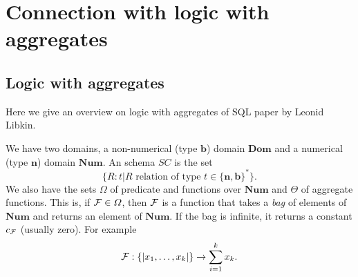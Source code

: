 \section{Connection with logic with aggregates}
\newcommand{\ML}{\mathsf{MATLANG}}
\newcommand{\reals}{\mathbf{R}}
\newcommand{\cmplx}{\mathbf{C}}
\newcommand{\nat}{\mathbf{N}}
\newcommand{\pnat}{\nat_{>0}}
\newcommand{\var}{var}
\newcommand{\scm}{\mathcal{S}}
\newcommand{\sizevar}{\mathsf{SizeVars}}
\newcommand{\mname}{\mathsf{MatNames}}
\newcommand{\allinst}[1]{\mathcal{I}_{#1}}
\newcommand{\cmats}{\mathcal{M}}
\newcommand{\false}{\bot}
\newcommand{\true}{\top}
\newcommand{\boolinterp}{\nu}
\newcommand{\Rel}{\mathit{Rel}}
\newcommand{\Mat}{\mathit{Mat}}
\newcommand{\one}{\mathbf{1}}
\newcommand{\Sum}{\mathsf{sum}}
\newcommand{\diag}{\mathsf{diag}}
\newcommand{\Apply}{\mathsf{apply}}
\newcommand{\Tb}{\mathbf{b}}
\newcommand{\Tn}{\mathbf{n}}
\newcommand{\dom}{\mathbf{dom}}
\newcommand{\rname}{\mathsf{RelNames}}
\newcommand{\bDom}{\textbf{Dom}}
\newcommand{\bNum}{\textbf{Num}}
\newtheorem{proposition}{Proposition}

\subsection{Logic with aggregates}

Here we give an overview on logic with aggregates of SQL paper by Leonid Libkin.

We have two domains, a non-numerical (type $\textbf{b}$) domain $\bDom$ and a numerical (type $\textbf{n}$) domain $\bNum$. An schema $SC$ is the set $$\lbrace R:t | R \text{ relation of type } t\in\lbrace\textbf{n},\textbf{b}\rbrace^*\rbrace.$$ We also have the sets $\Omega$ of predicate and functions over $\bNum$ and $\varTheta$ of aggregate functions. This is, if $\mathcal{F}\in\varOmega$, then $\mathcal{F}$ is a function that takes a \textit{bag} of elements of $\bNum$ and returns an element of $\bNum$. If the bag is infinite, it returns a constant $c_{\mathcal{F}}$ (usually zero). For example $$\mathcal{F}:\lbrace\vert x_1,\ldots,x_k\vert\rbrace\rightarrow\sum_{i=1}^k x_k.$$

